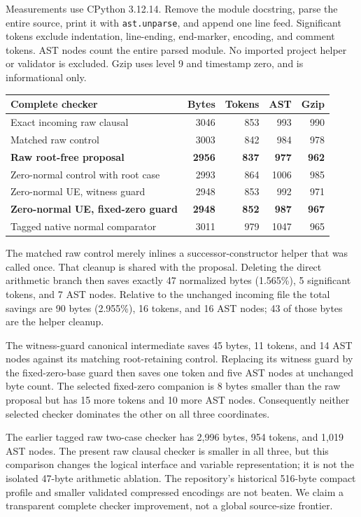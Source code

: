 \documentclass[11pt]{article}
\theoremstyle{definition}
\DeclareRobustCommand{\file}[1]{\nolinkurl{#1}}
\begin{document}
Measurements use CPython 3.12.14. Remove the module docstring, parse the
entire source, print it with \file{ast.unparse}, and append one line feed.
Significant tokens exclude indentation, line-ending, end-marker, encoding,
and comment tokens. AST nodes count the entire parsed module. No imported
project helper or validator is excluded. Gzip uses level 9 and timestamp
zero, and is informational only.

\begin{center}
\small
\begin{tabular}{lrrrr}
\toprule
Complete checker & Bytes & Tokens & AST & Gzip\\
\midrule
Exact incoming raw clausal & 3046 & 853 & 993 & 990\\
Matched raw control & 3003 & 842 & 984 & 978\\
\textbf{Raw root-free proposal} & \textbf{2956} & \textbf{837} & \textbf{977} & \textbf{962}\\
\midrule
Zero-normal control with root case & 2993 & 864 & 1006 & 985\\
Zero-normal UE, witness guard & 2948 & 853 & 992 & 971\\
\textbf{Zero-normal UE, fixed-zero guard} & \textbf{2948} & \textbf{852} & \textbf{987} & \textbf{967}\\
Tagged native normal comparator & 3011 & 979 & 1047 & 965\\
\bottomrule
\end{tabular}
\end{center}

The matched raw control merely inlines a successor-constructor helper
that was called once. That cleanup is shared with the proposal.
Deleting the direct arithmetic branch then saves exactly 47 normalized
bytes (1.565\%), 5 significant tokens, and 7 AST nodes. Relative to the
unchanged incoming file the total savings are 90 bytes (2.955\%), 16
tokens, and 16 AST nodes; 43 of those bytes are the helper cleanup.

The witness-guard canonical intermediate saves 45 bytes, 11 tokens, and
14 AST nodes against its matching root-retaining control. Replacing its
witness guard by the fixed-zero-base guard then saves one token and five
AST nodes at unchanged byte count. The selected fixed-zero companion is
8 bytes smaller than the raw proposal but has 15 more tokens and 10 more
AST nodes. Consequently neither selected checker dominates the other on
all three coordinates.

The earlier tagged raw two-case checker has 2,996 bytes, 954 tokens,
and 1,019 AST nodes. The present raw clausal checker is smaller in all
three, but this comparison changes the logical interface and variable
representation; it is not the isolated 47-byte arithmetic ablation.
The repository's historical 516-byte compact profile and smaller validated
compressed encodings are not beaten. We claim a transparent complete
checker improvement, not a global source-size frontier.
\end{document}
